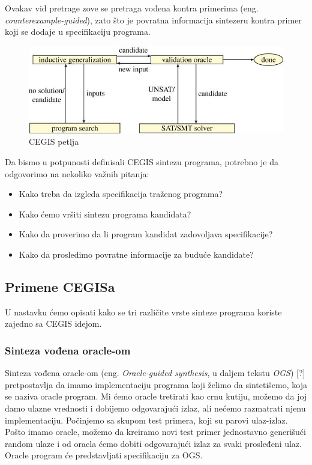 Ovakav vid pretrage zove se pretraga vođena kontra primerima (eng. \emph{counterexample-guided}), zato što je povratna informacija sintezeru kontra primer koji se dodaje u specifikaciju programa.

\begin{figure}[t]
    \begin{center}
        \includegraphics[scale=0.4]{resources/cegis.jpeg}
    \end{center}
    \caption{CEGIS petlja \cite{AboutPS}}
    \label{fig:cegis}
\end{figure}


Da bismo u potpunosti definisali CEGIS sintezu programa, potrebno je da odgovorimo na nekoliko važnih pitanja:

\begin{itemize}
    \item Kako treba da izgleda specifikacija traženog programa?
    \item Kako ćemo vršiti sintezu programa kandidata?
    \item Kako da proverimo da li program kandidat zadovoljava specifikacije?
    \item Kako da prosledimo povratne informacije za buduće kandidate?
\end{itemize}

\subsection{Primene CEGISa}
\label{subsec:PrimeneCEGISa}

U nastavku ćemo opisati kako se tri različite vrste sinteze programa koriste zajedno sa CEGIS idejom.


\subsubsection{Sinteza vođena oracle-om}
\label{subsec:OracleGuidedSynthesis}

Sinteza vođena oracle-om (eng. \emph{Oracle-guided synthesis}, u daljem tekstu \emph{OGS}) [?] pretpostavlja da imamo implementaciju programa koji želimo da sintetišemo, koja se naziva oracle program. Mi ćemo oracle tretirati kao crnu kutiju, možemo da joj damo ulazne vrednosti i dobijemo odgovarajući izlaz, ali nećemo razmatrati njenu implementaciju. Počinjemo sa skupom test primera, koji su parovi ulaz-izlaz. Pošto imamo oracle, možemo da kreiramo novi test primer jednostavno generišući random ulaze i od oracla ćemo dobiti odgovarajući izlaz za svaki prosleđeni ulaz. Oracle program će predstavljati specifikaciju za OGS.



